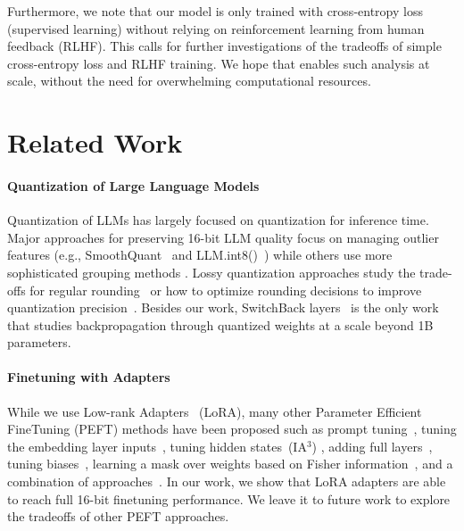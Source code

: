 Furthermore, we note that our model is only trained with cross-entropy loss (supervised learning) without relying on reinforcement learning from human feedback (RLHF). This calls for further investigations of the tradeoffs of simple cross-entropy loss and RLHF training. We hope that \method enables such analysis at scale, without the need for overwhelming computational resources.

\section{Related Work}



\paragraph{Quantization of Large Language Models} Quantization of LLMs has largely focused on quantization for inference time. 
Major approaches for preserving 16-bit LLM quality focus on managing outlier features (e.g., SmoothQuant~\citep{xiao2022smoothquant} and LLM.int8()~\citep{dettmers2022llm}) while others use more sophisticated grouping methods \citep{park2022nuqmm, yao2022zeroquant}. Lossy quantization approaches study the trade-offs for regular rounding~\citep{dettmers2022case,zeng2022glm,pope2022efficiently} or how to optimize rounding decisions to improve quantization precision~\citep{frantar2022gptq}. Besides our work, SwitchBack layers~\citep{wortsman2023stable} is the only work that studies backpropagation through quantized weights at a scale beyond 1B parameters.

\paragraph{Finetuning with Adapters} While we use Low-rank Adapters~\citep{hu2021lora} (LoRA), many other Parameter Efficient FineTuning (PEFT) methods have been proposed such as prompt tuning~\citep{qin2021learning,lester2021power,li2021prefix}, tuning the embedding layer inputs~\citep{an2022input}, tuning hidden states~(IA$^3$) \citep{liu2022few}, adding full layers~\citep{houlsby2019parameter}, tuning biases~\citep{zaken2021bitfit}, learning a mask over weights based on Fisher information~\citep{sung2021training}, and a combination of approaches~\citep{henderson2021compacter}. In our work, we show that LoRA adapters are able to reach full 16-bit finetuning performance. We leave it to future work to explore the tradeoffs of other PEFT approaches.

